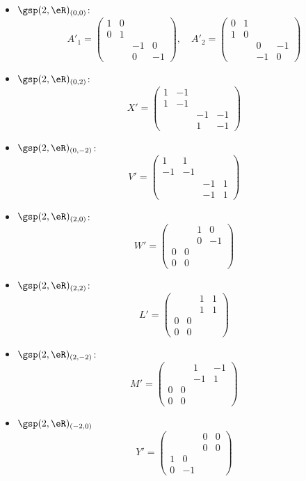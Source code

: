 \begin{itemize}
\item $\gsp(2,\eR)_{(0,0)}$:
\[
  A'_1=
\begin{pmatrix}
1&0\\
0&1\\
&&-1&0\\
&&0&-1
\end{pmatrix},
\quad
A'_2=
\begin{pmatrix}
0&1\\
1&0\\
&&0&-1\\
&&-1&0
\end{pmatrix}
\]
\item $\gsp(2,\eR)_{(0,2)}$:
\[
 X'= \begin{pmatrix}
1&-1&\\
1&-1&\\
&&-1&-1\\
&&1&-1
\end{pmatrix}
\]
\item $\gsp(2,\eR)_{(0,-2)}$:
\[
 V'= \begin{pmatrix}
1&1\\
-1&-1\\
&&-1&1\\
&&-1&1
\end{pmatrix}
\]
\item $\gsp(2,\eR)_{(2,0)}$:
\[
 W'= \begin{pmatrix}
&&1&0\\
&&0&-1\\
0&0\\0&0
\end{pmatrix}
\]
\item $\gsp(2,\eR)_{(2,2)}$:
\[
  L'=
\begin{pmatrix}
&&1&1\\
&&1&1\\
0&0\\0&0
\end{pmatrix}
\]
\item $\gsp(2,\eR)_{(2,-2)}$:
\[
  M'=
\begin{pmatrix}
&&1&-1\\
&&-1&1\\
0&0\\0&0
\end{pmatrix}
\]
\item $\gsp(2,\eR)_{(-2,0)}$
\[
Y'=
\begin{pmatrix}
&&0&0\\&&0&0\\
1&0\\0&-1

\end{pmatrix}\]
\end{itemize}
